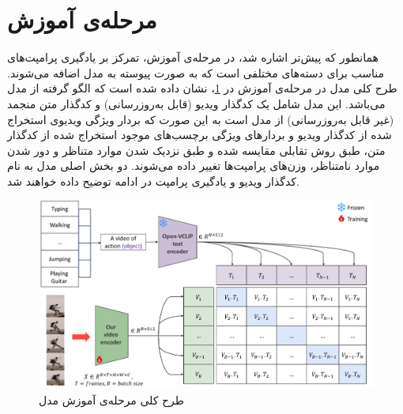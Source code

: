 \section{مرحله‌ی آموزش}
همانطور که پیش‌تر اشاره شد، در مرحله‌ی آموزش، تمرکز بر یادگیری پرامپت‌های مناسب برای دسته‌های مختلفی است که به صورت پیوسته به مدل اضافه می‌شوند. طرح کلی مدل در مرحله‌ی آموزش در \cref{fig.33}، نشان داده شده است که الگو گرفته از مدل  می‌باشد. این مدل شامل یک کدگذار ویدیو (قابل به‌روزرسانی) و کدگذار متن منجمد  (غیر قابل به‌روزرسانی) از مدل  است به این صورت که بردار ویژگی ویدیوی استخراج شده از کدگذار ویدیو و بردارهای ویژگی برچسب‌های موجود استخراج شده از کدگذار متن، طبق روش تقابلی مقایسه شده و طبق نزدیک شدن موارد متناظر و دور شدن موارد نامتناظر، وزن‌های پرامپت‌ها تغییر داده می‌شوند. دو بخش اصلی مدل به نام کدگذار ویدیو و یادگیری پرامپت در ادامه توضیح داده خواهند شد. 
‌\begin{figure}
	\centering\includegraphics[scale=.50]{Images/Chapter3/train_phase.png}
	\caption[]{طرح کلی مرحله‌ی آموزش مدل }
	\label{fig.33}
\end{figure}
